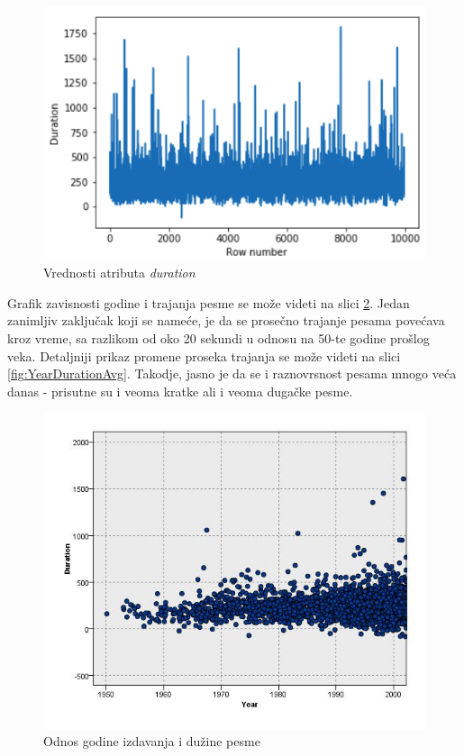 \begin{figure}[H]
    \includegraphics[scale=0.6]{resources/duration.png}
    \caption{Vrednosti atributa \emph{duration}}
    \label{fig:duration}
\end{figure}

Grafik zavisnosti godine i trajanja pesme se mo\v{z}e videti na slici \ref{fig:YearDuration}. Jedan zanimljiv zaklju\v{c}ak koji se name\'c{}e, je da se prose\v{c}no trajanje pesama pove\'c{}ava kroz vreme, sa razlikom od oko 20 sekundi u odnosu na 50-te godine pro\v{s}log veka. Detaljniji prikaz promene proseka trajanja se mo\v{z}e videti na slici \ref{fig:YearDurationAvg}. Takodje, jasno je da se i raznovrsnost pesama mnogo ve\'c{}a danas - prisutne su i veoma kratke ali i veoma duga\v{c}ke pesme.


\begin{figure}[H]
    \centering
    \includegraphics[scale=0.52]{resources/year-duration.jpg}
    \caption{Odnos godine izdavanja i du\v{z}ine pesme}
    \label{fig:YearDuration}
\end{figure}

